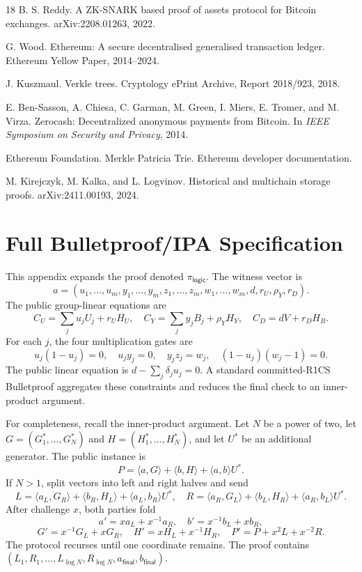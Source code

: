 \documentclass[runningheads]{llncs}
\newcommand{\inner}[2]{\langle #1,#2\rangle}
\begin{document}
\begin{thebibliography}{18}
B. S. Reddy.
\newblock A ZK-SNARK based proof of assets protocol for Bitcoin exchanges.
\newblock arXiv:2208.01263, 2022.

G. Wood.
\newblock Ethereum: A secure decentralised generalised transaction ledger.
\newblock Ethereum Yellow Paper, 2014--2024.

J. Kuszmaul.
\newblock Verkle trees.
\newblock Cryptology ePrint Archive, Report 2018/923, 2018.

E. Ben-Sasson, A. Chiesa, C. Garman, M. Green, I. Miers, E. Tromer, and M. Virza.
\newblock Zerocash: Decentralized anonymous payments from Bitcoin.
\newblock In \emph{IEEE Symposium on Security and Privacy}, 2014.

Ethereum Foundation.
\newblock Merkle Patricia Trie.
\newblock Ethereum developer documentation.

M. Kirejczyk, M. Kalka, and L. Logvinov.
\newblock Historical and multichain storage proofs.
\newblock arXiv:2411.00193, 2024.

\end{thebibliography}

\appendix
\setcounter{section}{0}
\renewcommand{\thesection}{\Alph{section}}
\renewcommand{\theHsection}{appendix.\Alph{section}}

\section{Full Bulletproof/IPA Specification}\label{app:bp}

This appendix expands the proof denoted \(\pi_{\mathsf{logic}}\).  The witness vector is
\[
        a=(u_1,\ldots,u_m,y_1,\ldots,y_m,z_1,\ldots,z_m,w_1,\ldots,w_m,d,r_U,\rho_Y,r_D).
\]
The public group-linear equations are
\[
 C_U=\sum_j u_jU_j+r_UH_U,
 \quad
 C_Y=\sum_j y_jB_j+\rho_YH_Y,
 \quad
 C_D=dV+r_DH_B.
\]
For each \(j\), the four multiplication gates are
\[
 u_j(1-u_j)=0,
 \quad u_jy_j=0,
 \quad y_jz_j=w_j,
 \quad (1-u_j)(w_j-1)=0.
\]
The public linear equation is \(d-\sum_j\delta_ju_j=0\).  A standard committed-R1CS Bulletproof aggregates these constraints and reduces the final check to an inner-product argument.

For completeness, recall the inner-product argument.  Let \(N\) be a power of two, let \(G=(G_1^*,\ldots,G_N^*)\) and \(H=(H_1^*,\ldots,H_N^*)\), and let \(U^*\) be an additional generator.  The public instance is
\[
        P=\inner{a}{G}+\inner{b}{H}+\inner{a}{b}U^*.
\]
If \(N>1\), split vectors into left and right halves and send
\[
 L=\inner{a_L}{G_R}+\inner{b_R}{H_L}+\inner{a_L}{b_R}U^*,
\quad
 R=\inner{a_R}{G_L}+\inner{b_L}{H_R}+\inner{a_R}{b_L}U^*.
\]
After challenge \(x\), both parties fold
\[
 a'=xa_L+x^{-1}a_R,
 \quad b'=x^{-1}b_L+xb_R,
\]
\[
 G'=x^{-1}G_L+xG_R,
 \quad H'=xH_L+x^{-1}H_R,
 \quad P'=P+x^2L+x^{-2}R.
\]
The protocol recurses until one coordinate remains.  The proof contains \((L_1,R_1,\ldots,L_{\log N},R_{\log N},a_{\mathsf{final}},b_{\mathsf{final}})\).
\end{document}
